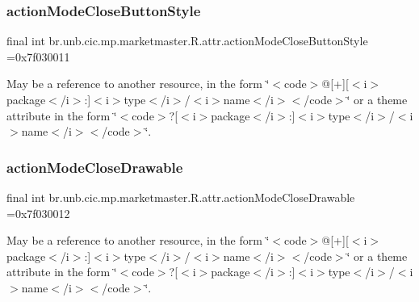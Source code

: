 \subsubsection{\texorpdfstring{action\+Mode\+Close\+Button\+Style}{actionModeCloseButtonStyle}}
{\footnotesize\ttfamily final int br.\+unb.\+cic.\+mp.\+marketmaster.\+R.\+attr.\+action\+Mode\+Close\+Button\+Style =0x7f030011\hspace{0.3cm}{\ttfamily [static]}}

May be a reference to another resource, in the form \char`\"{}$<$code$>$@\mbox{[}+\mbox{]}\mbox{[}$<$i$>$package$<$/i$>$\+:\mbox{]}$<$i$>$type$<$/i$>$/$<$i$>$name$<$/i$>$$<$/code$>$\char`\"{} or a theme attribute in the form \char`\"{}$<$code$>$?\mbox{[}$<$i$>$package$<$/i$>$\+:\mbox{]}$<$i$>$type$<$/i$>$/$<$i$>$name$<$/i$>$$<$/code$>$\char`\"{}. \mbox{\label{classbr_1_1unb_1_1cic_1_1mp_1_1marketmaster_1_1R_1_1attr_a7e3f3e69c5cc7b96d47d0adb88380858}} 
\subsubsection{\texorpdfstring{action\+Mode\+Close\+Drawable}{actionModeCloseDrawable}}
{\footnotesize\ttfamily final int br.\+unb.\+cic.\+mp.\+marketmaster.\+R.\+attr.\+action\+Mode\+Close\+Drawable =0x7f030012\hspace{0.3cm}{\ttfamily [static]}}

May be a reference to another resource, in the form \char`\"{}$<$code$>$@\mbox{[}+\mbox{]}\mbox{[}$<$i$>$package$<$/i$>$\+:\mbox{]}$<$i$>$type$<$/i$>$/$<$i$>$name$<$/i$>$$<$/code$>$\char`\"{} or a theme attribute in the form \char`\"{}$<$code$>$?\mbox{[}$<$i$>$package$<$/i$>$\+:\mbox{]}$<$i$>$type$<$/i$>$/$<$i$>$name$<$/i$>$$<$/code$>$\char`\"{}. \mbox{\label{classbr_1_1unb_1_1cic_1_1mp_1_1marketmaster_1_1R_1_1attr_ad3f6eabf9f4b462dc89eb4d49c9f7ab3}} 
